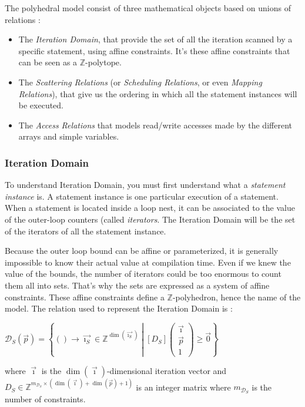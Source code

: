 \documentclass[paper=a4, fontsize=11pt]{scrartcl}
\numberwithin{equation}{section}        %
\numberwithin{figure}{section}          %
\numberwithin{table}{section}               %
\begin{document}
        The polyhedral model consist of three mathematical objects based on unions of relations :
        \begin{itemize}
            \item The \textit{Iteration Domain}, that provide the set of all the iteration scanned
                by a specific statement, using affine constraints. It's these affine constraints 
                that can be seen as a $\mathbb{Z}$-polytope.
            \item The \textit{Scattering Relations} (or \textit{Scheduling Relations},
                or even \textit{Mapping Relations}), that give us the ordering in which
                all the statement instances will be executed.
            \item The \textit{Access Relations} that models read/write accesses made by
                the different arrays and simple variables.
        \end{itemize}

            \subsubsection{Iteration Domain}
                To understand Iteration Domain, you must first understand what a \textit{statement instance}
                is. A statement instance is one particular execution of a statement.
                When a statement is located inside a loop nest, it can be associated to the value
                of the outer-loop counters (called \textit{iterators}.
                The Iteration Domain will be the set of the iterators of all the statement
                instance.

                Because the outer loop bound can be affine or parameterized, it is generally impossible to
                know their actual value at compilation time. Even if we knew the value of the
                bounds, the number of iterators could be too enormous to count them all into sets.
                That's why the sets are expressed as a system of affine constraints.
                These affine constraints define a $\mathbb{Z}$-polyhedron, hence the name of the model.
                The relation used to represent the Iteration Domain is :
                \begin{center}
                    $ \mathcal{D}_S(\vec{p}) = \left\{() \to \vec{\imath_S} \in \mathbb{Z}^{\dim(\vec{\imath_S})}
                    \middle|
                    \left[D_S\right]\begin{pmatrix}\vec{\imath} \\ \vec{p} \\ 1\end{pmatrix}
                    \geq \vec{0}
                    \right\}$
                \end{center}
                where $\vec{\imath}$ is the $\dim(\vec{\imath})$-dimensional iteration vector and
                $D_S \in \mathbb{Z}^{m_{\mathcal{D}_S} \times (\dim(\vec{\imath})+\dim(\vec{p})+1)}$
                is an integer matrix where $m_{\mathcal{D}_S}$ is the number of constraints.
                \\
\end{document}
